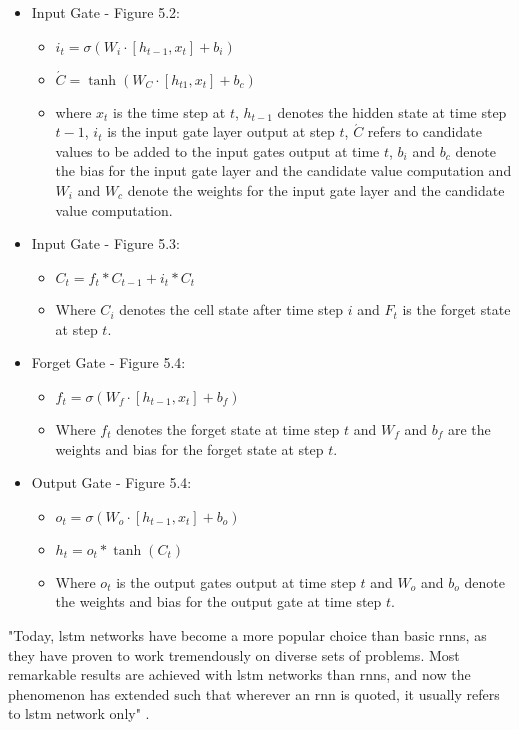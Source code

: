 \documentclass[a4paper, 11pt,titlepage,oneside,openany]{book}
\begin{document}
\begin{itemize}
	\item Input Gate - Figure 5.2: 
	\begin{itemize}
			\item $i_t=\sigma(W_i \cdot [h_{t-1}, x_t]+b_i)$
			\item $\acute{C}=\tanh(W_C \cdot [h_{t1}, x_t]+b_c)$
			\item where $x_t$ is the time step at $t$, $h_{t-1}$ denotes the hidden state at time step $t-1$, $i_t$ is the input gate layer output at step $t$, $\acute{C}$ refers to candidate values to be added to the input gates output at time $t$, $b_i$ and $b_c$ denote the bias for the input gate layer and the candidate value computation and $W_i$ and $W_c$ denote the weights for the input gate layer and the candidate value computation.
		\end{itemize}	
	\item  Input Gate - Figure 5.3:
	\begin{itemize}
		\item $C_t=f_t*C_{t-1}+i_t*C_t$
		\item Where $C_i$ denotes the cell state after time step $i$ and $F_t$ is the forget state at step $t$.
	\end{itemize}
	\item Forget Gate - Figure 5.4:
	\begin{itemize}
		\item $f_t=\sigma(W_f \cdot [h_{t-1}, x_t]+b_f)$
		\item Where $f_t$ denotes the forget state at time step $t$ and $W_f$ and $b_f$ are the weights and bias for the forget state at step $t$.
	\end{itemize}
	\item Output Gate - Figure 5.4:
	\begin{itemize}
		\item $o_t=\sigma(W_o \cdot [h_{t-1},x_t]+b_o)$
		\item $h_t=o_t*\tanh(C_t)$
		\item Where $o_t$ is the output gates output at time step $t$ and $W_o$ and $b_o$ denote the weights and bias for the output gate at time step $t$.
	\end{itemize}
\end{itemize}


\noindent "Today, \gls{lstm} networks have become a more popular choice than basic \gls{rnn}s, as they have proven to work tremendously on diverse sets of problems. Most remarkable results are achieved with \gls{lstm} networks than \gls{rnn}s, and now the phenomenon has extended such that wherever an \gls{rnn} is quoted, it usually refers to \gls{lstm} network only" \cite{rnn}.
\end{document}
